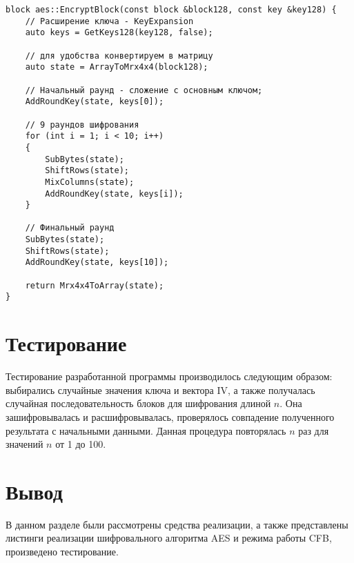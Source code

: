 \clearpage

\begin{lstlisting}[label=lst:AES-m,caption=Реализация алгоритма AES]
block aes::EncryptBlock(const block &block128, const key &key128) {
	// Расширение ключа - KeyExpansion
	auto keys = GetKeys128(key128, false);
	
	// для удобства конвертируем в матрицу
	auto state = ArrayToMrx4x4(block128);
	
	// Начальный раунд - сложение с основным ключом;
	AddRoundKey(state, keys[0]);
	
	// 9 раундов шифрования
	for (int i = 1; i < 10; i++)
	{
		SubBytes(state);
		ShiftRows(state);
		MixColumns(state);
		AddRoundKey(state, keys[i]);
	}
	
	// Финальный раунд
	SubBytes(state);
	ShiftRows(state);
	AddRoundKey(state, keys[10]);
	
	return Mrx4x4ToArray(state);
}
\end{lstlisting}


\section{Тестирование}

Тестирование разработанной программы производилось следующим образом: выбирались случайные значения ключа и вектора IV, а также получалась случайная последовательность блоков для шифрования длиной $n$. Она зашифровывалась и расшифровывалась, проверялось совпадение полученного результата с начальными данными. Данная процедура повторялась $n$ раз для значений $n$ от 1 до 100.

\section*{Вывод}

В данном разделе были рассмотрены средства реализации, а также представлены листинги реализации шифровального алгоритма AES и режима работы CFB,  произведено тестирование.